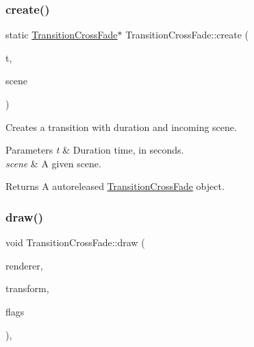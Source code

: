 \subsubsection{\texorpdfstring{create()}{create()}\hspace{0.1cm}{\footnotesize\ttfamily [2/2]}}
{\footnotesize\ttfamily static \hyperlink{classTransitionCrossFade}{Transition\+Cross\+Fade}$\ast$ Transition\+Cross\+Fade\+::create (\begin{DoxyParamCaption}\item[{float}]{t,  }\item[{\hyperlink{classScene}{Scene} $\ast$}]{scene }\end{DoxyParamCaption})\hspace{0.3cm}{\ttfamily [static]}}

Creates a transition with duration and incoming scene.


\begin{DoxyParams}{Parameters}
{\em t} & Duration time, in seconds. \\
\hline
{\em scene} & A given scene. \\
\hline
\end{DoxyParams}
\begin{DoxyReturn}{Returns}
A autoreleased \hyperlink{classTransitionCrossFade}{Transition\+Cross\+Fade} object. 
\end{DoxyReturn}
\mbox{\label{classTransitionCrossFade_a261b721fc33fb8eaa01efeeb3d88db56}} 
\subsubsection{\texorpdfstring{draw()}{draw()}\hspace{0.1cm}{\footnotesize\ttfamily [1/2]}}
{\footnotesize\ttfamily void Transition\+Cross\+Fade\+::draw (\begin{DoxyParamCaption}\item[{\hyperlink{classRenderer}{Renderer} $\ast$}]{renderer,  }\item[{const \hyperlink{classMat4}{Mat4} \&}]{transform,  }\item[{uint32\+\_\+t}]{flags }\end{DoxyParamCaption})\hspace{0.3cm}{\ttfamily [override]}, {\ttfamily [virtual]}}

